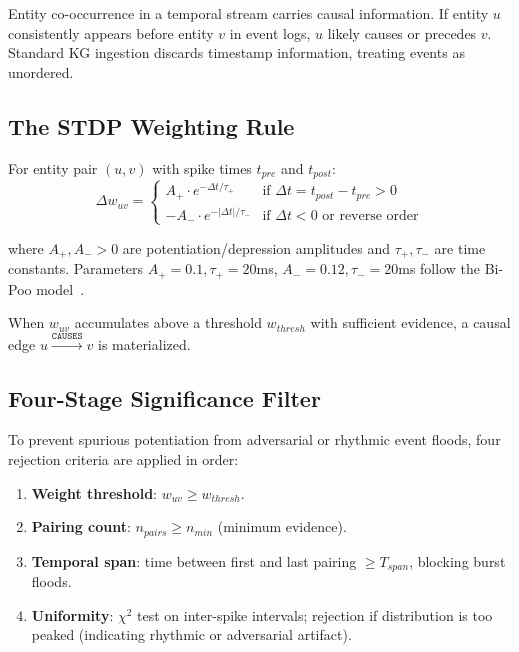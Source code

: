 \documentclass[10pt,twocolumn]{article}
\begin{document}
Entity co-occurrence in a temporal stream carries causal information. If entity $u$
consistently appears before entity $v$ in event logs, $u$ likely causes or precedes $v$.
Standard KG ingestion discards timestamp information, treating events as unordered.

\subsection{The STDP Weighting Rule}

For entity pair $(u, v)$ with spike times $t_{pre}$ and $t_{post}$:
\begin{equation}
\Delta w_{uv} = \begin{cases}
  A_+ \cdot e^{-\Delta t / \tau_+} & \text{if } \Delta t = t_{post} - t_{pre} > 0 \\
  -A_- \cdot e^{-|\Delta t| / \tau_-} & \text{if } \Delta t < 0 \text{ or reverse order}
\end{cases}
\label{eq:stdp}
\end{equation}

where $A_+, A_- > 0$ are potentiation/depression amplitudes and $\tau_+, \tau_-$ are time
constants. Parameters $A_+ = 0.1, \tau_+ = 20$ms, $A_- = 0.12, \tau_- = 20$ms follow
the Bi-Poo model~\cite{bipoo1998}.

When $w_{uv}$ accumulates above a threshold $w_{thresh}$ with sufficient evidence, a
causal edge $u \xrightarrow{\texttt{CAUSES}} v$ is materialized.

\subsection{Four-Stage Significance Filter}

To prevent spurious potentiation from adversarial or rhythmic event floods, four
rejection criteria are applied in order:
\begin{enumerate}
  \item \textbf{Weight threshold}: $w_{uv} \geq w_{thresh}$.
  \item \textbf{Pairing count}: $n_{pairs} \geq n_{min}$ (minimum evidence).
  \item \textbf{Temporal span}: time between first and last pairing $\geq T_{span}$,
        blocking burst floods.
  \item \textbf{Uniformity}: $\chi^2$ test on inter-spike intervals; rejection if
        distribution is too peaked (indicating rhythmic or adversarial artifact).
\end{enumerate}
\end{document}
